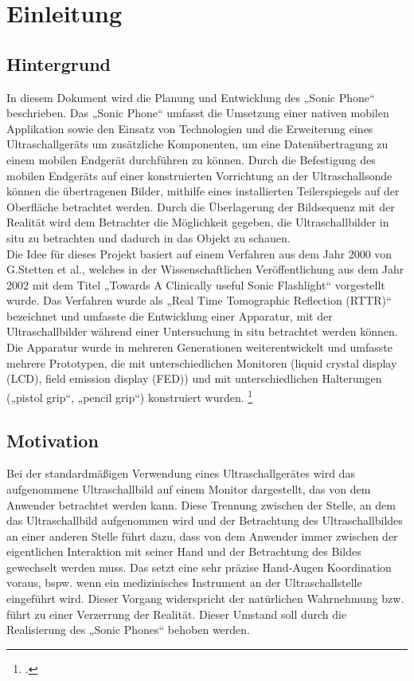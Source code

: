 \chapter{Einleitung}
\section{Hintergrund}
In diesem Dokument wird die Planung und Entwicklung des „Sonic Phone“ beschrieben. Das „Sonic Phone“ umfasst die Umsetzung einer nativen mobilen Applikation sowie den Einsatz von Technologien und die Erweiterung eines Ultraschallgeräts um zusätzliche Komponenten, um eine Datenübertragung zu einem mobilen Endgerät durchführen zu können. Durch die Befestigung des mobilen Endgeräts auf einer konstruierten Vorrichtung an der Ultraschallsonde können die übertragenen Bilder, mithilfe eines installierten Teilerspiegels auf der Oberfläche betrachtet werden. Durch die Überlagerung der Bildsequenz mit der Realität wird dem Betrachter die Möglichkeit gegeben, die Ultraschallbilder in situ zu betrachten und dadurch in das Objekt zu schauen.\\
Die Idee für dieses Projekt basiert auf einem Verfahren aus dem Jahr 2000 von G.Stetten et al., welches in der Wissenschaftlichen Veröffentlichung aus dem Jahr 2002 mit dem Titel „Towards A Clinically useful Sonic Flashlight“ vorgestellt wurde. Das Verfahren wurde als „Real Time Tomographic Reflection (RTTR)“ bezeichnet und umfasste die Entwicklung einer Apparatur, mit der Ultraschallbilder während einer Untersuchung in situ  betrachtet werden können. Die Apparatur wurde in mehreren Generationen weiterentwickelt und umfasste mehrere Prototypen, die mit unterschiedlichen Monitoren (liquid crystal display (LCD), field emission display (FED)) und mit unterschiedlichen Halterungen („pistol grip“, „pencil grip“) konstruiert wurden. \footcite{SonicFlashlight} 

\section{Motivation}
Bei der standardmäßigen Verwendung eines Ultraschallgerätes wird das aufgenommene Ultraschallbild auf einem Monitor dargestellt, das von dem Anwender betrachtet werden kann. Diese Trennung zwischen der Stelle, an dem das Ultraschallbild aufgenommen wird und der Betrachtung des Ultraschallbildes an einer anderen Stelle führt dazu, dass von dem Anwender immer zwischen der eigentlichen Interaktion mit seiner Hand und der Betrachtung des Bildes gewechselt werden muss. Das setzt eine sehr präzise Hand-Augen Koordination voraus, bspw. wenn ein medizinisches Instrument an der Ultraschallstelle eingeführt wird. Dieser Vorgang widerspricht der natürlichen Wahrnehmung bzw. führt zu einer Verzerrung der Realität. Dieser Umstand soll durch die Realisierung des „Sonic Phones“ behoben werden.
